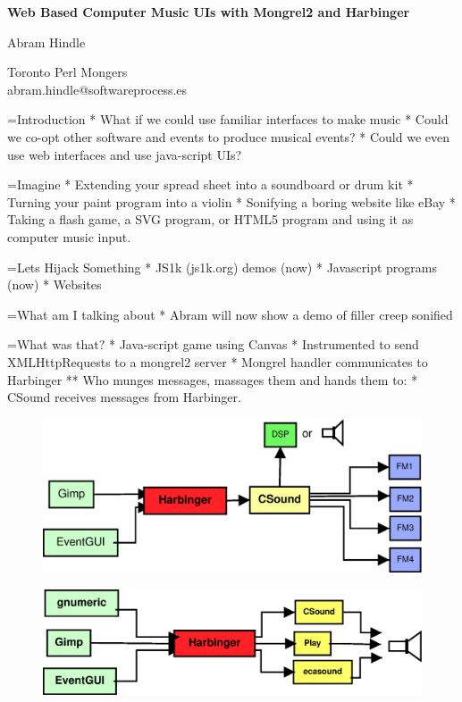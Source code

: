 \documentclass[titlepage,usenames,a4,landscape,semhelv]{seminar}
\author{
\names \\ 
{\small Toronto  Perl Mongers} \\
abram.hindle@softwareprocess.es
}
\newcommand{\gettitle}{Web Based Computer Music UIs with Mongrel2 and Harbinger}
\newcommand{\getmaintitle}{\gettitle}
\newcommand{\names}{Abram Hindle}
\begin{document}
\pagestyle{fancy} %
\begin{slide}

\begin{center}
{\bf \LARGE \getmaintitle }

{\names } 

{\small Toronto Perl Mongers} \\
abram.hindle@softwareprocess.es



\end{center}


=Introduction
* What if we could use familiar interfaces to make music
* Could we co-opt other software and events to produce musical events?
* Could we even use web interfaces and use java-script UIs?

=Imagine
* Extending your spread sheet into a soundboard or drum kit
* Turning your paint program into a violin
* Sonifying a boring website like eBay
* Taking a flash game, a SVG program, or HTML5 program and using it as
computer music input.

=Lets Hijack Something
* JS1k (js1k.org) demos (now)
* Javascript programs (now)
* Websites

=What am I talking about
* Abram will now show a demo of filler creep sonified

=What was that?
* Java-script game using Canvas
* Instrumented to send XMLHttpRequests to a mongrel2 server
* Mongrel handler communicates to Harbinger
** Who munges messages, massages them and hands them to:
* CSound receives messages from Harbinger.

\newslide

\begin{figure}
  \centering
\includegraphics[width=\textwidth]{harbinger}  
\end{figure}

\newslide

\begin{figure}
  \centering
\includegraphics[width=\textwidth]{harbinger-example}  
\end{figure}


\end{slide}
\end{document}
